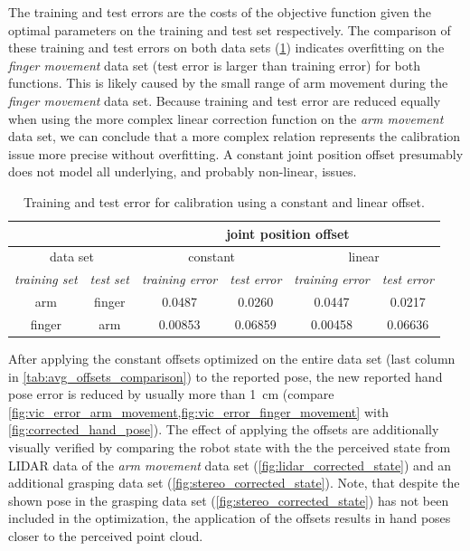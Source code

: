 The training and test errors are the costs of the objective function given the optimal parameters on the training and test set respectively. The comparison of these training and test errors on both data sets (\cref{tab:offset_training_test_error}) indicates overfitting on the \textit{finger movement} data set (test error is larger than training error) for both functions. This is likely caused by the small range of arm movement during the \textit{finger movement} data set. Because training and test error are reduced equally when using the more complex linear correction function on the \textit{arm movement} data set, we can conclude that a more complex relation represents the calibration issue more precise without overfitting. A constant joint position offset presumably does not model all underlying, and probably non-linear, issues.

\begin{table}[h]
\centering
\begin{tabular}{|c|c||c|c||c|c|}
\hline
\multicolumn{2}{|c||}{} & \multicolumn{4}{c|}{joint position offset} \\
\hline
\multicolumn{2}{|c||}{data set}  & \multicolumn{2}{c||}{constant} & \multicolumn{2}{c|}{linear} \\
\hline
\textit{training set} & \textit{test set} & \textit{training error} & \textit{test error} & \textit{training error} & \textit{test error} \\
\hline
arm & finger & 0.0487 & 0.0260 & 0.0447 & 0.0217 \\
\hline
finger & arm & 0.00853 & 0.06859 & 0.00458 & 0.06636 \\
\hline
\end{tabular}
\caption[Calibration error comparison]{Training and test error for calibration using a constant and linear offset.}
\label{tab:offset_training_test_error}
\end{table}

After applying the constant offsets optimized on the entire data set (last column in \cref{tab:avg_offsets_comparison}) to the reported pose, the new reported hand pose error is reduced by usually more than \SI{1}{\cm} (compare \cref{fig:vic_error_arm_movement,fig:vic_error_finger_movement} with \cref{fig:corrected_hand_pose}). The effect of applying the offsets are additionally visually verified by comparing the robot state with the the perceived state from LIDAR data of the \textit{arm movement} data set (\cref{fig:lidar_corrected_state}) and an additional grasping data set (\cref{fig:stereo_corrected_state}). Note, that despite the shown pose in the grasping data set (\cref{fig:stereo_corrected_state}) has not been included in the optimization, the application of the offsets results in hand poses closer to the perceived point cloud.

